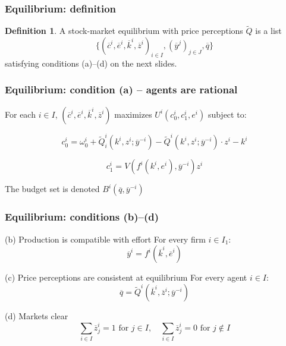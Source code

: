 \documentclass[blue]{beamer}
\theoremstyle{definition}
\theoremstyle{example}
\newtheorem*{definitionns}{Definition}
\begin{document}
\begin{frame}\frametitle{Equilibrium: definition}
\begin{definitionns}
A stock-market equilibrium with price perceptions $\widetilde{Q}$ is a list
\begin{equation*}
\bigl\{ (\overline{c}^i, \overline{e}^i, \overline{k}^i, \overline{z}^i)_{i \in I}, (\overline{y}^j)_{j \in J}, \overline{q} \bigr\}
\end{equation*}
satisfying conditions (a)--(d) on the next slides.
\end{definitionns}
\end{frame}

\begin{frame}\frametitle{Equilibrium: condition (a) -- agents are rational}
For each $i \in I$, $(\overline{c}^i, \overline{e}^i, \overline{k}^i, \overline{z}^i)$ maximizes $U^i(c^i_0, c^i_1, e^i)$ subject to:
\bigskip

\begin{equation*}
c^i_0 = \omega^i_0 + \widetilde{Q}^i_i(k^i, z^i; \overline{y}^{-i}) - \widetilde{Q}^i(k^i, z^i; \overline{y}^{-i}) \cdot z^i - k^i
\end{equation*}
\bigskip

\begin{equation*}
c^i_1 = V(f^i(k^i, e^i), \overline{y}^{-i}) z^i
\end{equation*}
\bigskip

The budget set is denoted $B^i(\overline{q}, \overline{y}^{-i})$
\end{frame}

\begin{frame}\frametitle{Equilibrium: conditions (b)--(d)}
\begin{block}{(b) Production is compatible with effort}
For every firm $i \in I_1$:
\begin{equation*}
\overline{y}^i = f^i(\overline{k}^i, \overline{e}^i)
\end{equation*}
\end{block}

\begin{block}{(c) Price perceptions are consistent at equilibrium}
For every agent $i \in I$:
\begin{equation*}
\overline{q} = \widetilde{Q}^i(\overline{k}^i, \overline{z}^i; \overline{y}^{-i})
\end{equation*}
\end{block}

\begin{block}{(d) Markets clear}
\begin{equation*}
\sum_{i \in I} \overline{z}^i_j = 1 \text{ for $j \in I$}, \quad \sum_{i \in I} \overline{z}^i_j = 0 \text{ for $j \notin I$}
\end{equation*}
\end{block}
\end{frame}
\end{document}
